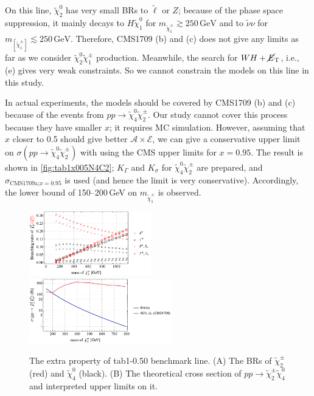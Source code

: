 \documentclass[a4paper,10pt,captions=tableheading,DIV=14]{scrartcl}
\numberwithin{equation}{section}
\newcommand\w[1]{_{\mathrm{#1}}}
\newcommand\unit[1]{\,\mathrm{#1}\xspace}
\newcommand\GeV{\unit{GeV}}
\newcommand\neut  [1][\relax]{{\tilde\chi^0_{#1}}}
\newcommand\charPM[1][\relax]{{\tilde\chi^\pm_{#1}}}
\newcommand\mET{\cancel{E}\w T}
\begin{document}
On this line, $\neut[2]$ has very small BRs to $\tilde\ell$ or $Z$; because of the phase space suppression, it mainly decays to $H\neut[1]$ for $m_{\charPM[1]}\gtrsim250\GeV$ and to $\tilde\nu\nu$ for $m_[\charPM[1]]\lesssim250\GeV$.
Therefore, CMS1709 (b) and (c) does not give any limits as far as we consider $\neut[2]\charPM[1]$ production.
Meanwhile, the search for $WH+\mET$, i.e., (e) gives very weak constraints.
So we cannot constrain the models on this line in this study.

In actual experiments, the models should be covered by CMS1709 (b) and (c) because of the events from $pp\to\neut[4]\charPM[2]$.
Our study cannot cover this process because they have smaller $x$; it requires MC simulation.
However, assuming that $x$ closer to 0.5 should give better $\mathcal A\times\mathcal E$, we can give a conservative upper limit on $\sigma(pp\to\neut[4]\charPM[2])$ with using the CMS upper limits for $x=0.95$.
The result is shown in \cref{fig:tab1x005N4C2}; $K_\Gamma$ and $K_\sigma$ for $\neut[4]\charPM[2]$ are prepared, and $\sigma_{\text{CMS1709a;$x=0.95$}}$ is used (and hence the limit is very conservative).
Accordingly, the lower bound  of 150--200\,GeV on $m_{\charPM[1]}$ is observed.

\begin{figure}[b]
  \centering
  \includegraphics[height=80pt]{../plots/plot_tab1x095_br42.pdf}
  \includegraphics[height=80pt]{../plots/plot_tab1x095_limit42.pdf}

  \caption{\label{fig:tab1x095N4C2}The extra property of tab1-0.50 benchmark line.
 (A) The BRs of $\charPM[2]$ (red) and $\neut[4]$ (black).
 (B) The theoretical cross section of $pp\to\charPM[2]\neut[4]$ and interpreted upper limits on it.
}
\end{figure}





\clearpage


\end{document}

